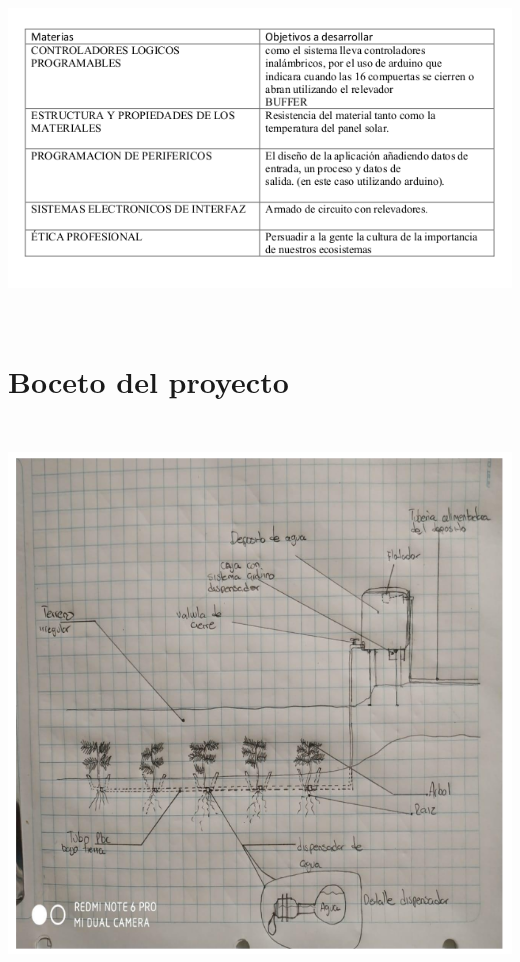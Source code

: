 \documentclass[a4paper,11pt,titlepage]{article}
\begin{document}
\begin{titlepage}
  \includegraphics[height=9cm]{cul.png} \\

\section{Boceto del proyecto}


  \includegraphics[height=15cm]{boce.png} \\
  

\end{titlepage}
\end{document}
